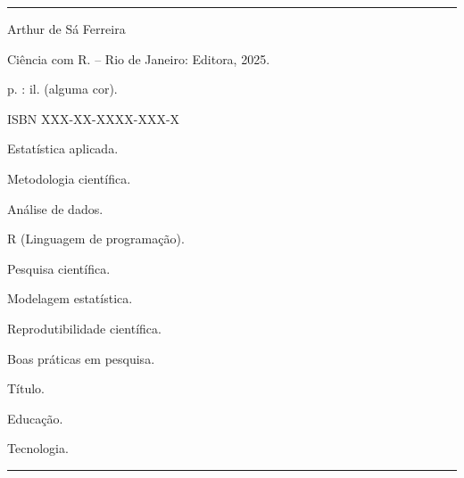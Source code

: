 \newcommand{\autorLivro}{Arthur de Sá Ferreira}
\newcommand{\tituloLivro}{Ciência com R}
\newcommand{\localPublicacao}{Rio de Janeiro}
\newcommand{\editora}{Editora}
\newcommand{\anoPublicacao}{2025}
\newcommand{\isbn}{XXX-XX-XXXX-XXX-X}

\newcommand{\palavraschavea}{Estatística aplicada}
\newcommand{\palavraschaveb}{Metodologia científica}
\newcommand{\palavraschavec}{Análise de dados}
\newcommand{\palavraschaved}{R (Linguagem de programação)}
\newcommand{\palavraschavee}{Pesquisa científica}
\newcommand{\palavraschavef}{Modelagem estatística}
\newcommand{\palavraschaveg}{Reprodutibilidade científica}
\newcommand{\palavraschaveh}{Boas práticas em pesquisa}


\hrule
\begin{center}
\begin{minipage}[c]{12.5cm}

\autorLivro

\hspace{0.5cm} \tituloLivro. -- \localPublicacao: \editora, \anoPublicacao.

\hspace{0.5cm} \pageref{LastPage} p. : il. (alguma cor).

\hspace{0.5cm} ISBN \isbn

\hspace{0.5cm}
\begin{inparaenum}[1.]
  \item \palavraschavea.
  \item \palavraschaveb.
  \item \palavraschavec.
  \item \palavraschaved.
  \item \palavraschavee.
  \item \palavraschavef.
  \item \palavraschaveg.
  \item \palavraschaveh.
\end{inparaenum}

\begin{inparaenum}[I.]
  \item Título.
  \item Educação.
  \item Tecnologia.
\end{inparaenum}

\end{minipage}
\end{center}
\hrule


